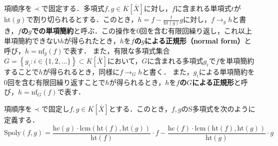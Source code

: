\par
項順序を$\prec$で固定する．多項式$f, g \in K[\bar{X}]$に対し，$f$に含まれる単項式$t$が$\mathrm{ht}(g)$で割り切られるとする．このとき，$h = f - \frac{t}{\mathrm{ht}(g)}g$に対し，$f \to_g h$と書き，\textbf{$f$の$g$での単項簡約}と呼ぶ．この操作を$0$回を含む有限回繰り返し，これ以上単項簡約できない$h$が得られたとき，$h$を\textbf{$f$の$g$による正規形（normal form）}と呼び，$h = \mathrm{nf}_g(f)$で表す．
また，有限な多項式集合$G=\left\{g_i :i \in \{1,2, \dots\}\right\} \subset K[\bar{X}]$において，$G$に含まれる多項式$g_i$で$f$を単項簡約することで$h$が得られるとき，同様に$f \to_G h$と書く．
また，$g_i$による単項簡約を$0$回を含む有限回繰り返すことで$h$が得られるとき，$h$を\textbf{$f$の$G$による正規形}と呼び，$h = \mathrm{nf}_G(f)$で表す．
\begin{definition}[S多項式]
	項順序を$\prec$で固定し$f, g \in K[\bar{X}]$とする．このとき，$f, g$のS多項式を次のように定義する．
	$$\mathrm{Spoly}(f, g)=\frac{\mathrm{hc}(g)\cdot \mathrm{lcm}(\mathrm{ht}(f), \mathrm{ht}(g))}{\mathrm{ht}(f)}\cdot f - \frac{\mathrm{hc}(f)\cdot \mathrm{lcm}(\mathrm{ht}(f), \mathrm{ht}(g))}{\mathrm{ht}(g)}\cdot g$$
	\end{definition}








